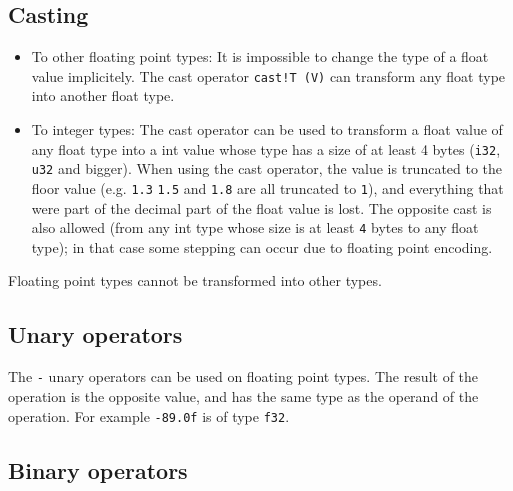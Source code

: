 \subsection{Casting}
\label{sec:org9eacb07}

\begin{itemize}
\item To other floating point types: It is impossible to change the type of a float value implicitely. The cast
  operator \texttt{cast!T (V)} can transform any float type into another float type.

\item To integer types: The cast operator can be used to transform a float value of any float type
  into a int value whose type has a size of at least 4 bytes (\texttt{i32}, \texttt{u32} and
  bigger). When using the cast operator, the value is truncated to the floor
  value (e.g. \texttt{1.3} \texttt{1.5} and \texttt{1.8} are all truncated to \texttt{1}), and everything
  that were part of the decimal part of the float value is lost. The opposite
  cast is also allowed (from any int type whose size is at least \texttt{4} bytes to
  any float type); in that case some stepping can occur due to floating point
  encoding.
\end{itemize}

Floating point types cannot be transformed into other types.

\subsection{Unary operators}
\label{sec:org30770bf}

The \texttt{-} unary operators can be used on floating point types. The result of the
operation is the opposite value, and has the same type as the operand of the
operation. For example \texttt{-89.0f} is of type \texttt{f32}.

\subsection{Binary operators}
\label{sec:orga43d13a}

